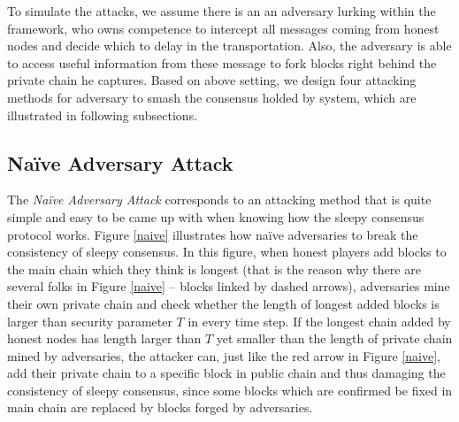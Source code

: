 \documentclass{llncs}
\begin{document}
To simulate the attacks, we assume there is an an adversary lurking within the  framework, who owns competence to intercept all messages coming from honest nodes and decide which to delay in the transportation. Also, the adversary is able to access useful information from these message to fork blocks right behind the private chain he captures. Based on above setting, we design four attacking methods for adversary to smash the consensus holded by system, which are illustrated in following subsections.
\subsection{Na{\"i}ve Adversary Attack}
\quad The \emph{Na{\"i}ve Adversary Attack} corresponds to an attacking method that is quite simple and easy to be came up with when knowing how the sleepy consensus protocol works. Figure \ref{naive} illustrates how na{\"i}ve adversaries to break the consistency of sleepy consensus. In this figure, when honest players add blocks to the main chain which they think is longest (that is the reason why there are several folks in Figure \ref{naive} -- blocks linked by dashed arrows), adversaries mine their own private chain and check whether the length of longest added blocks is larger than security parameter $T$ in every time step. If the longest chain added by honest nodes has length larger than $T$ yet smaller than the length of private chain mined by adversaries, the attacker can, just like the red arrow in Figure \ref{naive}, add their private chain to a specific block in public chain and thus damaging the consistency of sleepy consensus, since some blocks which are confirmed be fixed in main chain are replaced by blocks forged by adversaries.
\vspace{-4mm}
\end{document}
